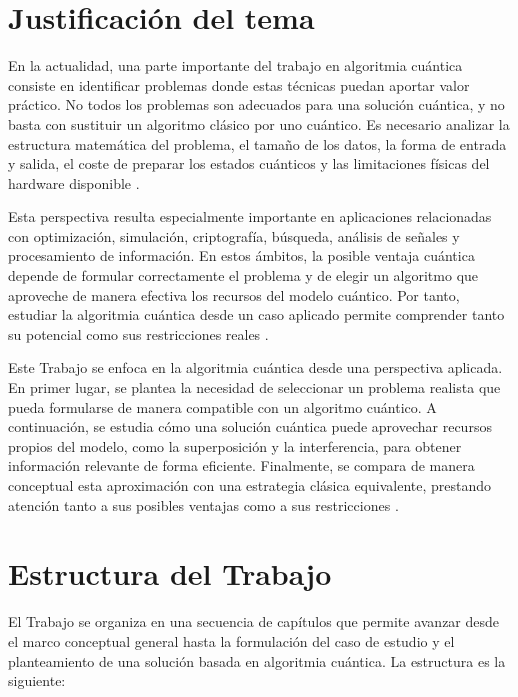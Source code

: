 \section{Justificación del tema}

En la actualidad, una parte importante del trabajo en algoritmia cuántica consiste en identificar problemas donde estas técnicas puedan aportar valor práctico. No todos los problemas son adecuados para una solución cuántica, y no basta con sustituir un algoritmo clásico por uno cuántico. Es necesario analizar la estructura matemática del problema, el tamaño de los datos, la forma de entrada y salida, el coste de preparar los estados cuánticos y las limitaciones físicas del hardware disponible \citep{nielsen2010,preskill2018}.

Esta perspectiva resulta especialmente importante en aplicaciones relacionadas con optimización, simulación, criptografía, búsqueda, análisis de señales y procesamiento de información. En estos ámbitos, la posible ventaja cuántica depende de formular correctamente el problema y de elegir un algoritmo que aproveche de manera efectiva los recursos del modelo cuántico. Por tanto, estudiar la algoritmia cuántica desde un caso aplicado permite comprender tanto su potencial como sus restricciones reales \citep{montanaro2016,preskill2018}.

Este Trabajo se enfoca en la algoritmia cuántica desde una perspectiva aplicada. En primer lugar, se plantea la necesidad de seleccionar un problema realista que pueda formularse de manera compatible con un algoritmo cuántico. A continuación, se estudia cómo una solución cuántica puede aprovechar recursos propios del modelo, como la superposición y la interferencia, para obtener información relevante de forma eficiente. Finalmente, se compara de manera conceptual esta aproximación con una estrategia clásica equivalente, prestando atención tanto a sus posibles ventajas como a sus restricciones \citep{nielsen2010,montanaro2016,preskill2018}.

\section{Estructura del Trabajo}

El Trabajo se organiza en una secuencia de capítulos que permite avanzar desde el marco conceptual general hasta la formulación del caso de estudio y el planteamiento de una solución basada en algoritmia cuántica. La estructura es la siguiente:


